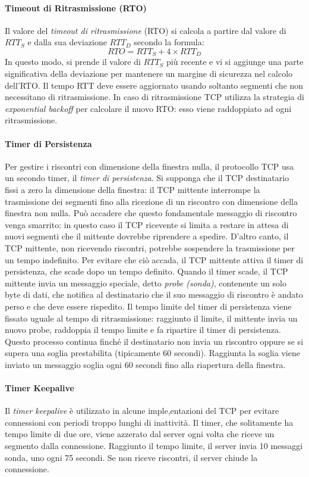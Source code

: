 \documentclass[12pt]{report}
\begin{document}
	\paragraph{Timeout di Ritrasmissione (RTO)}
	Il valore del \emph{timeout di ritrasmissione} (RTO) si calcola a partire dal valore di \( RTT_S \) e dalla sua deviazione \( RTT_D \) secondo la formula:
	\[
	RTO = RTT_S + 4 \times RTT_D
	\]
	In questo modo, si prende il valore di \( RTT_S \) più recente e vi si aggiunge una parte significativa della deviazione per mantenere un margine di sicurezza nel calcolo dell'RTO. 
	Il tempo RTT deve essere aggiornato usando soltanto segmenti che non necessitano di ritrasmissione.
	In caso di ritrasmissione TCP utilizza la strategia di \textit{exponential backoff} per calcolare il nuovo RTO: esso viene raddoppiato ad ogni ritrasmissione.

	\paragraph{Timer di Persistenza}
	Per gestire i riscontri con dimensione della finestra nulla, il protocollo TCP usa un secondo timer, il \textit{timer di persistenza}. Si supponga che il TCP destinatario fissi a zero la dimensione della finestra: il TCP mittente interrompe la trasmissione dei segmenti fino alla ricezione di un riscontro con dimensione della finestra non nulla. Può accadere che questo fondamentale messaggio di riscontro venga smarrito: in questo caso il TCP ricevente si limita a restare in attesa di nuovi segmenti che il mittente dovrebbe riprendere a spedire. D'altro canto, il TCP mittente, non ricevendo riscontri, potrebbe sospendere la trasmissione per un tempo indefinito. Per evitare che ciò accada, il TCP mittente attiva il timer di persistenza, che scade dopo un tempo definito. Quando il timer scade, il TCP mittente invia un messaggio speciale, detto \textit{probe (sonda)}, contenente un solo byte di dati, che notifica al destinatario che il suo messaggio di riscontro è andato perso e che deve essere rispedito. Il tempo limite del timer di persistenza viene fissato uguale al tempo di ritrasmissione: raggiunto il limite, il mittente invia un nuovo probe, raddoppia il tempo limite e fa ripartire il timer di persistenza. Questo processo continua finché il destinatario non invia un riscontro oppure se si supera una soglia prestabilita (tipicamente 60 secondi). Raggiunta la soglia viene inviato un messaggio soglia ogni 60 secondi fino alla riapertura della finestra.
 
	\paragraph{Timer Keepalive}
	Il \textit{timer keepalive} è utilizzato in alcune imple,entazioni del TCP per evitare connessioni con periodi troppo lunghi di inattività. Il timer, che solitamente ha tempo limite di due ore, viene azzerato dal server ogni volta che riceve un segmento dalla connessione. Raggiunto il tempo limite, il server invia 10 messaggi sonda, uno ogni 75 secondi. Se non riceve riscontri, il server chiude la connessione.
\end{document}
